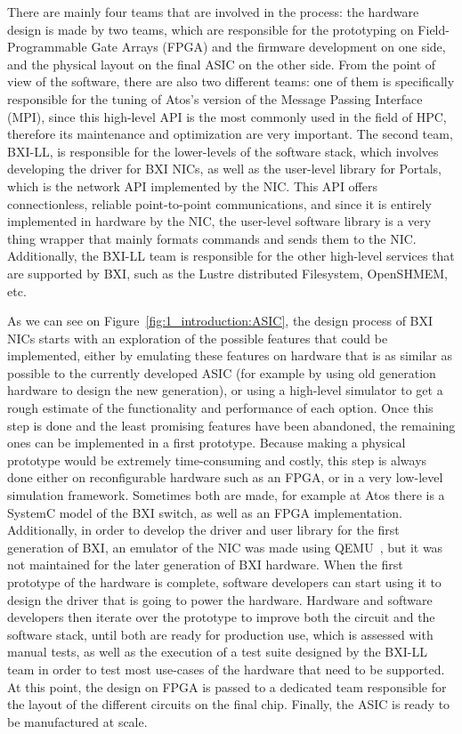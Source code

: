 There are mainly four teams that are involved in the process: the hardware
design is made by two teams, which are responsible for the prototyping on
Field-Programmable Gate Arrays (FPGA) and the firmware development on one side,
and the physical layout on the final ASIC on the other side. From the point of
view of the software, there are also two different teams: one of them is
specifically responsible for the tuning of Atos's version of the Message Passing
Interface (MPI), since this high-level API is the most commonly used in the
field of HPC, therefore its maintenance and optimization are very important. The
second team, BXI-LL, is responsible for the lower-levels of the software stack,
which involves developing the driver for BXI NICs, as well as the user-level
library for Portals, which is the network API implemented by the NIC. This API
offers connectionless, reliable point-to-point communications, and since it is
entirely implemented in hardware by the NIC, the user-level software library is
a very thing wrapper that mainly formats commands and sends them to the NIC.
Additionally, the BXI-LL team is responsible for the other high-level services
that are supported by BXI, such as the Lustre distributed Filesystem, OpenSHMEM,
etc.

As we can see on Figure~\ref{fig:1_introduction:ASIC}, the design process of BXI
NICs starts with an exploration of the possible features that could be
implemented, either by emulating these features on hardware that is as similar
as possible to the currently developed ASIC (for example by using old generation
hardware to design the new generation), or using a high-level simulator to get a
rough estimate of the functionality and performance of each option. Once this
step is done and the least promising features have been abandoned, the remaining
ones can be implemented in a first prototype. Because making a physical
prototype would be extremely time-consuming and costly, this step is always done
either on reconfigurable hardware such as an FPGA, or in a very low-level
simulation framework. Sometimes both are made, for example at Atos there is a
SystemC model of the BXI switch, as well as an FPGA implementation.
Additionally, in order to develop the driver and user library for the first
generation of BXI, an emulator of the NIC was made using
QEMU~\cite{bellard2005qemu}, but it was not maintained for the later generation
of BXI hardware. When the first prototype of the hardware is complete, software
developers can start using it to design the driver that is going to power the
hardware. Hardware and software developers then iterate over the prototype to
improve both the circuit and the software stack, until both are ready for
production use, which is assessed with manual tests, as well as the execution of
a test suite designed by the BXI-LL team in order to test most use-cases of the
hardware that need to be supported. At this point, the design on FPGA is passed
to a dedicated team responsible for the layout of the different circuits on the
final chip. Finally, the ASIC is ready to be manufactured at scale.

